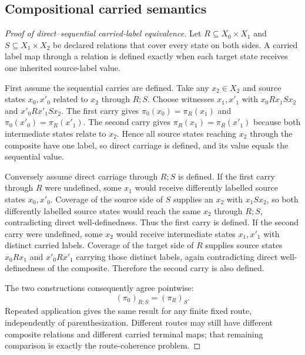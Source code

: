 \subsection{Compositional carried semantics}
\begin{proof}[Proof of direct--sequential carried-label equivalence]
Let $R\subseteq X_0\times X_1$ and $S\subseteq X_1\times X_2$ be declared relations that cover every state on both sides. A carried label map through a relation is defined exactly when each target state receives one inherited source-label value.

First assume the sequential carries are defined. Take any $x_2\in X_2$ and source states $x_0,x'_0$ related to $x_2$ through $R;S$. Choose witnesses $x_1,x'_1$ with $x_0Rx_1Sx_2$ and $x'_0Rx'_1Sx_2$. The first carry gives $\pi_0(x_0)=\pi_R(x_1)$ and $\pi_0(x'_0)=\pi_R(x'_1)$. The second carry gives $\pi_R(x_1)=\pi_R(x'_1)$ because both intermediate states relate to $x_2$. Hence all source states reaching $x_2$ through the composite have one label, so direct carriage is defined, and its value equals the sequential value.

Conversely assume direct carriage through $R;S$ is defined. If the first carry through $R$ were undefined, some $x_1$ would receive differently labelled source states $x_0,x'_0$. Coverage of the source side of $S$ supplies an $x_2$ with $x_1Sx_2$, so both differently labelled source states would reach the same $x_2$ through $R;S$, contradicting direct well-definedness. Thus the first carry is defined. If the second carry were undefined, some $x_2$ would receive intermediate states $x_1,x'_1$ with distinct carried labels. Coverage of the target side of $R$ supplies source states $x_0Rx_1$ and $x'_0Rx'_1$ carrying those distinct labels, again contradicting direct well-definedness of the composite. Therefore the second carry is also defined.

The two constructions consequently agree pointwise:
\[
(\pi_0)_{R;S}=(\pi_R)_S.
\]
Repeated application gives the same result for any finite fixed route, independently of parenthesization. Different routes may still have different composite relations and different carried terminal maps; that remaining comparison is exactly the route-coherence problem.
\end{proof}


